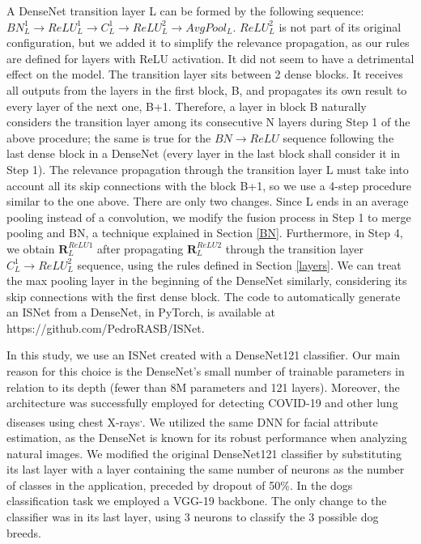 \documentclass[fleqn,10pt]{wlscirep}
\begin{document}
{A DenseNet transition layer L can be formed by the following sequence: $BN^{1}_{L} \rightarrow ReLU^{1}_{L} \rightarrow C^{1}_{L} \rightarrow ReLU^{2}_{L} \rightarrow AvgPool_{L}$. $ReLU^{2}_{L}$ is not part of its original configuration, but we added it to simplify the relevance propagation, as our rules are defined for layers with ReLU activation. It did not seem to have a detrimental effect on the model. The transition layer sits between 2 dense blocks. It receives all outputs from the layers in the first block, B, and propagates its own result to every layer of the next one, B+1. Therefore, a layer in block B naturally considers the transition layer among its consecutive N layers during Step 1 of the above procedure; the same is true for the $BN \rightarrow ReLU$ sequence following the last dense block in a DenseNet (every layer in the last block shall consider it in Step 1). The relevance propagation through the transition layer L must take into account all its skip connections with the block B+1, so we use a 4-step procedure similar to the one above. There are only two changes. Since L ends in an average pooling instead of a convolution, we modify the fusion process in Step 1 to merge pooling and BN, a technique explained in Section \ref{BN}.  Furthermore, in Step 4, we obtain $\bm{R}_{L}^{ReLU1}$ after propagating $\bm{R}_{L}^{ReLU2}$ through the transition layer $C^{1}_{L}\rightarrow ReLU^{2}_{L}$ sequence, using the rules defined in Section \ref{layers}. We can treat the max pooling layer in the beginning of the DenseNet similarly, considering its skip connections with the first dense block. The code to automatically generate an ISNet from a DenseNet, in PyTorch, is available at https://github.com/PedroRASB/ISNet. 

In this study, we use an ISNet created with a DenseNet121 classifier. Our main reason for this choice is the DenseNet's small number of trainable parameters in relation to its depth (fewer than 8M parameters and 121 layers). Moreover, the architecture was successfully employed for detecting COVID-19 and other lung diseases using chest X-rays\cite{bassiCovid}\textsuperscript{,}\cite{chexnet}. We utilized the same DNN for facial attribute estimation, as the DenseNet is known for its robust performance when analyzing natural images\cite{DenseNet}. We modified the original DenseNet121 classifier by substituting its last layer with a layer containing the same number of neurons as the number of classes in the application, preceded by dropout of 50\%. In the dogs classification task we employed a VGG-19 backbone. The only change to the classifier was in its last layer, using 3 neurons to classify the 3 possible dog breeds.


}
\end{document}
